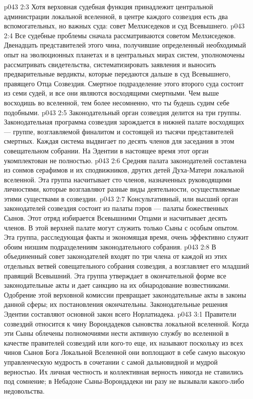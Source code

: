 \vs p043 2:3 \pc Хотя верховная судебная функция принадлежит центральной администрации локальной вселенной, в центре каждого созвездия есть два вспомогательных, но важных суда: совет Мелхиседеков и суд Всевышнего.
\vs p043 2:4 Все судебные проблемы сначала рассматриваются советом Мелхиседеков. Двенадцать представителей этого чина, получившие определенный необходимый опыт на эволюционных планетах и в центральных мирах систем, уполномочены рассматривать свидетельства, систематизировать заявления и выносить предварительные вердикты, которые передаются дальше в суд Всевышнего, правящего Отца Созвездия. Смертное подразделение этого второго суда состоит из семи судей, и все они являются восходящими смертными. Чем выше восходишь во вселенной, тем более несомненно, что ты будешь судим себе подобными.
\vs p043 2:5 \pc Законодательный орган созвездия делится на три группы. Законодательная программа созвездия зарождается в нижней палате восходящих --- группе, возглавляемой финалитом и состоящей из тысячи представителей смертных. Каждая система выдвигает по десять членов для заседания в этом совещательном собрании. На Эдентии в настоящее время этот орган укомплектован не полностью.
\vs p043 2:6 Средняя палата законодателей составлена из сонмов серафимов и их сподвижников, других детей Духа\hyp{}Матери локальной вселенной. Эта группа насчитывает сто членов, назначенных руководящими личностями, которые возглавляют разные виды деятельности, осуществляемые этими существами в созвездии.
\vs p043 2:7 Консультативный, или высший орган законодателей созвездия состоит из палаты пэров --- палаты божественных Сынов. Этот отряд избирается Всевышними Отцами и насчитывает десять членов. В этой верхней палате могут служить только Сыны с особым опытом. Эта группа, расследующая факты и экономящая время, очень эффективно служит обоим низшим подразделениям законодательного собрания.
\vs p043 2:8 В объединенный совет законодателей входят по три члена от каждой из этих отдельных ветвей совещательного собрания созвездия, а возглавляет его младший правящий Всевышний. Эта группа утверждает в окончательной форме все законодательные акты и дает санкцию на их обнародование возвестниками. Одобрение этой верховной комиссии превращает законодательные акты в законы данной сферы; их постановления окончательны. Законодательные решения Эдентии составляют основной закон всего Норлатиадека.
\vs p043 3:1 Правители созвездий относится к чину Ворондадеков сыновства локальной вселенной. Когда эти Сыны облечены полномочиями нести активную службу во вселенной в качестве правителей созвездий или кого\hyp{}то еще, их называют  поскольку из всех чинов Сынов Бога Локальной Вселенной они воплощают в себе самую высокую управленческую мудрость в сочетании с самой дальновидной и мудрой верностью. Их личная честность и коллективная верность никогда не ставились под сомнение; в Небадоне Сыны\hyp{}Ворондадеки ни разу не вызывали какого\hyp{}либо недовольства.
